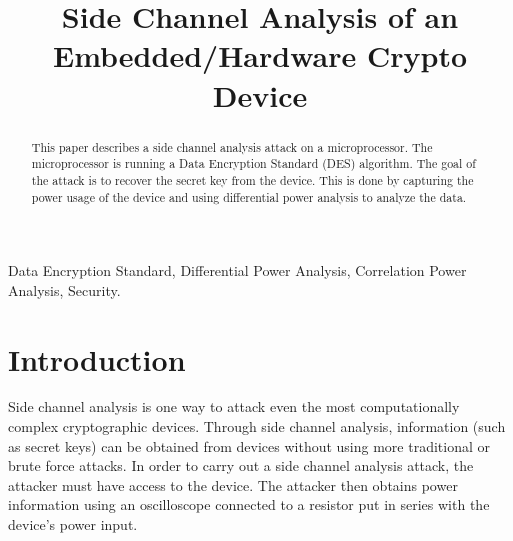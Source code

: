 
\usepackage{tikz}
\usepackage{verbatim}
\usepackage{listings}
\usepackage{pgfplots}


\title{Side Channel Analysis of an Embedded/Hardware Crypto Device}

\author{
}

\maketitle


\begin{abstract}
%
This paper describes a side channel analysis attack on a microprocessor.  The microprocessor is running a Data Encryption Standard (DES) algorithm.  The goal of the attack is to recover the secret key from the device.  This is done by capturing the power usage of the device and using differential power analysis to analyze the data. 
 
\end{abstract}

\begin{IEEEkeywords}
Data Encryption Standard, Differential Power Analysis, Correlation Power Analysis, Security.
\end{IEEEkeywords}

\section{Introduction}
	Side channel analysis is one way to attack even the most computationally complex cryptographic devices.  Through side channel analysis, information (such as secret keys) can be obtained from devices without using more traditional or brute force attacks.  In order to carry out a side channel analysis attack, the attacker must have access to the device.  The attacker then obtains power information using an oscilloscope connected to a resistor put in series with the device's power input.

